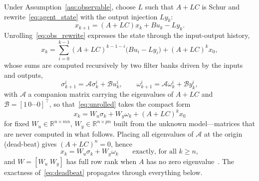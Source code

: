 \documentclass[final,5p,times]{elsarticle}
\theoremstyle{plain}
\theoremstyle{definition}
\theoremstyle{remark}
\newcommand{\R}{\mathbb{R}}
\begin{document}
Under Assumption~\ref{ass:observable}, choose $L$ such that $A + LC$ is Schur and rewrite~\eqref{eq:agent_state} with the output injection $L y_k$:
\begin{equation}
x_{k+1} = (A + LC)x_k + Bu_k - L y_k.
\label{eq:obs_rewrite}
\end{equation}
Unrolling~\eqref{eq:obs_rewrite} expresses the state through the input-output history,
\begin{equation}
x_k = \sum_{i=0}^{k-1}(A+LC)^{k-1-i}\big(Bu_i - L y_i\big) + (A+LC)^k x_0,
\label{eq:unrolled}
\end{equation}
whose sums are computed recursively by two filter banks driven by the inputs and outputs,
\begin{equation}
\sigma_{k+1}^i = \mathcal{A}\sigma_k^i + \mathcal{B}u_k^i, \qquad \omega_{k+1}^i = \mathcal{A}\omega_k^i + \mathcal{B}y_k^i,
\label{eq:filters}
\end{equation}
with $\mathcal{A}$ a companion matrix carrying the eigenvalues of $A + LC$ and $\mathcal{B} = [1 \, 0 \cdots 0]^\top$, so that~\eqref{eq:unrolled} takes the compact form~\cite[Thm.~2.1]{rizvi2022}
\begin{equation}
x_k = W_u \sigma_k + W_y \omega_k + (A + LC)^k x_0
\label{eq:state_param}
\end{equation}
for fixed $W_u \in \R^{n \times mn}$, $W_y \in \R^{n \times pn}$ built from the unknown model---matrices that are never computed in what follows. Placing all eigenvalues of $\mathcal{A}$ at the origin (dead-beat) gives $(A+LC)^n = 0$, hence~\cite[Thm.~2.2]{rizvi2022}
\begin{equation}
x_k = W_u \sigma_k + W_y \omega_k \qquad \text{exactly, for all } k \geq n,
\label{eq:deadbeat}
\end{equation}
and $W = [W_u \; W_y]$ has full row rank when $A$ has no zero eigenvalue~\cite[Thm.~2.4, Rem.~2.2]{rizvi2022}. The exactness of~\eqref{eq:deadbeat} propagates through everything below.
\end{document}
